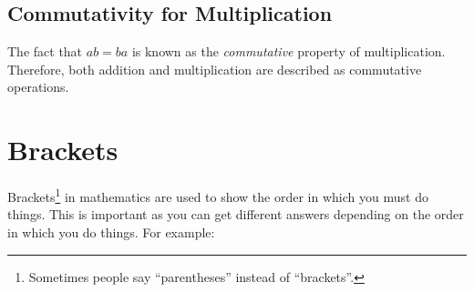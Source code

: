             \subsection{  Commutativity for Multiplication }
            \nopagebreak
      \label{m38346*id172933}The fact that $ab=ba$ is known as
the \textsl{commutative} property of multiplication. Therefore, both addition
and multiplication are described as commutative operations. \par 
    \section{Brackets}
            \nopagebreak
      \label{m38346*id172976}Brackets\label{m38346*uid10}\footnote{Sometimes people say ``parentheses'' instead of ``brackets''.}
in mathematics are used to show the order in which you must do things. This is
important as you can get different answers depending on the order in which you
do things. For example:\par 
      \label{m38346*uid11}\nopagebreak\noindent{}

